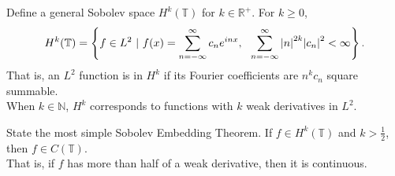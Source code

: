 \documentclass[avery5388,grid,frame]{flashcards}
\def\Rl{\mathbb{R}}
\def\torus{\mathbb{T}}
\begin{document}
\begin{flashcard}
    {Define a general Sobolev space $H^k(\torus)$ for $k \in \Rl^+$.}
    For $k \geq 0$,
    \begin{align*}
        H^k(\torus) = \left\{f \in L^2\ |\ f(x) = \sum_{n=-\infty}^\infty c_ne^{inx},\ \ \sum_{n=-\infty}^\infty \abs{n}^{2k}\abs{c_n}^2 < \infty\right\}.
    \end{align*}
    That is, an $L^2$ function is in $H^k$ if its Fourier coefficients are $n^kc_n$ square summable. \\

    When $k \in \mathbb{N}$, $H^k$ corresponds to functions with $k$ weak derivatives in $L^2$.
\end{flashcard}

\begin{flashcard}
    {State the most simple Sobolev Embedding Theorem.}
    If $f \in H^k(\torus)$ and $k > \frac{1}{2}$, then $f \in C(\torus)$. \\

    That is, if $f$ has more than half of a weak derivative, then it is continuous.
\end{flashcard}
\end{document}

